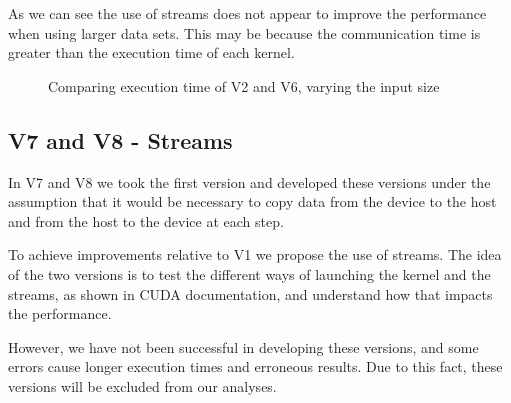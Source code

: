 \documentclass[conference]{IEEEtran}
\begin{document}
As we can see the use of streams does not appear to improve the performance when using larger data sets. This may be because the communication time is greater than the execution time of each kernel.


\begin{figure}[ht]
  \centering
  \caption{Comparing execution time of V2 and V6, varying the input size}
  \label{fig:v2andv6Grid}
\end{figure}

\subsection{V7 and V8 - Streams}

In V7 and V8 we took the first version and developed these versions under the assumption that it would be necessary to copy data from the device to the host and from the host to the device at each step.

To achieve improvements relative to V1 we propose the use of streams. The idea of the two versions is to test the different ways of launching the kernel and the streams, as shown in CUDA documentation, and understand how that impacts the performance.\cite{HowOverlapData2012}

However, we have not been successful in developing these versions, and some errors cause longer execution times and erroneous results. Due to this fact, these versions will be excluded from our analyses.
\end{document}
